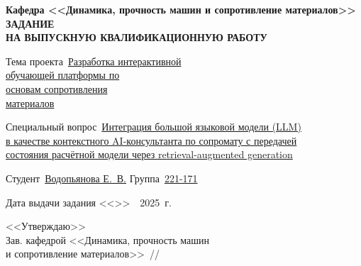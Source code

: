 \thispagestyle{empty}

\begin{center}
  \textbf{Кафедра <<Динамика, прочность машин и сопротивление материалов>>}\\[0.8em]
  {\fontsize{16pt}{18pt}\selectfont\textbf{ЗАДАНИЕ}}\\[0.4em]
  {\fontsize{16pt}{18pt}\selectfont\textbf{НА ВЫПУСКНУЮ КВАЛИФИКАЦИОННУЮ РАБОТУ}}
\end{center}

\vspace{1.6em}

\noindent Тема проекта~\underline{Разработка интерактивной\hfill}\\[0.4em]
\underline{обучающей платформы по\hfill}\\[0.4em]
\underline{основам сопротивления\hfill}\\[0.4em]
\underline{материалов\hfill}

\vspace{1.6em}

\noindent Специальный вопрос~\underline{Интеграция большой языковой модели (LLM)\hfill}\\[0.4em]
\underline{в качестве контекстного AI-консультанта по сопромату с передачей\hfill}\\[0.4em]
\underline{состояния расчётной модели через retrieval-augmented generation\hfill}

\vspace{2em}

\noindent Студент~\underline{Водопьянова Е.~В.\hspace{1.5cm}}\hspace{1cm} Группа~\underline{221-171\hspace{1.5cm}}

\vspace{2em}

\noindent Дата выдачи задания <<\underline{\hspace{0.7cm}}>>~\underline{\hspace{2.4cm}}~2025~г.

\vspace{2em}

\noindent <<Утверждаю>>\\[0.5em]
Зав. кафедрой <<Динамика, прочность машин\\
и сопротивление материалов>>\hfill\underline{\hspace{3.2cm}}~/\underline{\hspace{3.5cm}}/

\newpage
